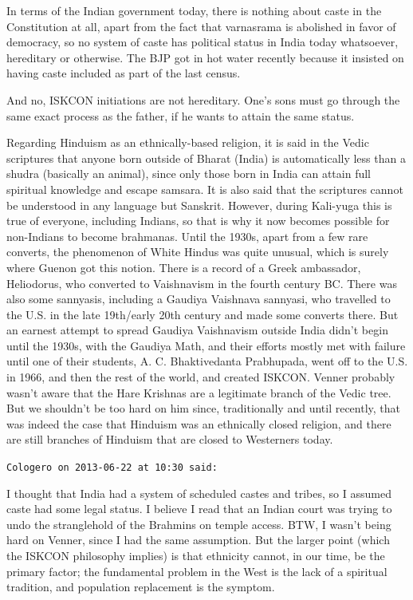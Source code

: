 \begin{footnotesize}
\begin{sffamily}
In terms of the Indian government today, there is nothing about caste in the Constitution at all, apart from the fact that varnasrama is abolished in favor of democracy, so no system of caste has political status in India today whatsoever, hereditary or otherwise. The BJP got in hot water recently because it insisted on having caste included as part of the last census.

And no, ISKCON initiations are not hereditary. One's sons must go through the same exact process as the father, if he wants to attain the same status.

Regarding Hinduism as an ethnically-based religion, it is said in the Vedic scriptures that anyone born outside of Bharat (India) is automatically less than a shudra (basically an animal), since only those born in India can attain full spiritual knowledge and escape samsara. It is also said that the scriptures cannot be understood in any language but Sanskrit. However, during Kali-yuga this is true of everyone, including Indians, so that is why it now becomes possible for non-Indians to become brahmanas. Until the 1930s, apart from a few rare converts, the phenomenon of White Hindus was quite unusual, which is surely where Guenon got this notion. There is a record of a Greek ambassador, Heliodorus, who converted to Vaishnavism in the fourth century BC. There was also some sannyasis, including a Gaudiya Vaishnava sannyasi, who travelled to the U.S. in the late 19th/early 20th century and made some converts there. But an earnest attempt to spread Gaudiya Vaishnavism outside India didn't begin until the 1930s, with the Gaudiya Math, and their efforts mostly met with failure until one of their students, A. C. Bhaktivedanta Prabhupada, went off to the U.S. in 1966, and then the rest of the world, and created ISKCON. Venner probably wasn't aware that the Hare Krishnas are a legitimate branch of the Vedic tree. But we shouldn't be too hard on him since, traditionally and until recently, that was indeed the case that Hinduism was an ethnically closed religion, and there are still branches of Hinduism that are closed to Westerners today.

\hfill

\texttt{Cologero on 2013-06-22 at 10:30 said:}

I thought that India had a system of scheduled castes and tribes, so I assumed caste had some legal status. I believe I read that an Indian court was trying to undo the stranglehold of the Brahmins on temple access. BTW, I wasn't being hard on Venner, since I had the same assumption. But the larger point (which the ISKCON philosophy implies) is that ethnicity cannot, in our time, be the primary factor; the fundamental problem in the West is the lack of a spiritual tradition, and population replacement is the symptom.


\end{sffamily}
\end{footnotesize}
